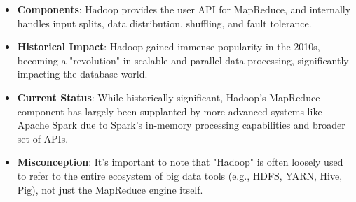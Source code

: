 \documentclass{article}
\begin{document}
\begin{itemize}
    \item \textbf{Components}: Hadoop provides the user API for MapReduce, and internally handles input splits, data distribution, shuffling, and fault tolerance.
    \item \textbf{Historical Impact}: Hadoop gained immense popularity in the 2010s, becoming a "revolution" in scalable and parallel data processing, significantly impacting the database world.
    \item \textbf{Current Status}: While historically significant, Hadoop's MapReduce component has largely been supplanted by more advanced systems like Apache Spark due to Spark's in-memory processing capabilities and broader set of APIs.
    \item \textbf{Misconception}: It's important to note that "Hadoop" is often loosely used to refer to the entire ecosystem of big data tools (e.g., HDFS, YARN, Hive, Pig), not just the MapReduce engine itself.
\end{itemize}
\end{document}
